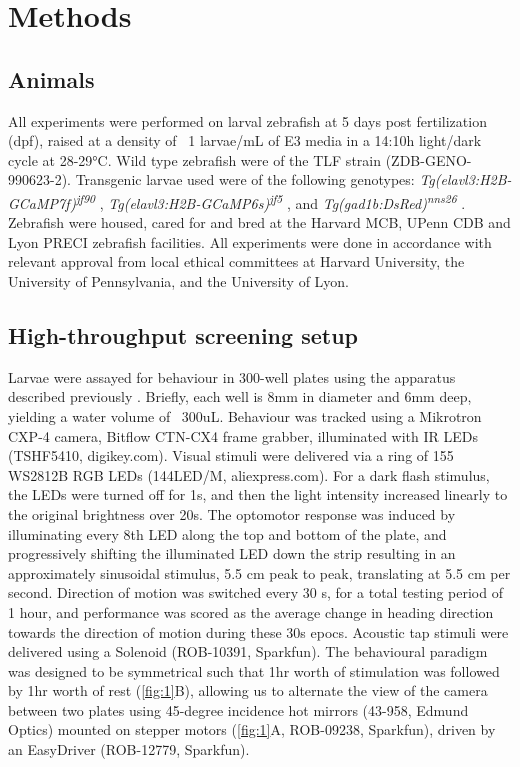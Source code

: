 \documentclass[9pt,lineno]{RandlettLab_elife}
\begin{document}
\section{Methods}

\subsection{Animals}

All experiments were performed on larval zebrafish at 5 days post fertilization (dpf), raised at a density of ~1 larvae/mL of E3 media in a 14:10h light/dark cycle at 28-29°C. Wild type zebrafish were of the TLF strain (ZDB-GENO-990623-2). Transgenic larvae used were of the following genotypes: \emph{Tg(elavl3:H2B-GCaMP7f)\textsuperscript{jf90}} \cite{Yang2021-uf}, \emph{Tg(elavl3:H2B-GCaMP6s)\textsuperscript{jf5}} \cite{Freeman2014-yo}, and \emph{Tg(gad1b:DsRed)\textsuperscript{nns26}} \cite{Satou2013-af}. Zebrafish were housed, cared for and bred at the Harvard MCB, UPenn CDB and Lyon PRECI zebrafish facilities. All experiments were done in accordance with relevant approval from local ethical committees at Harvard University, the University of Pennsylvania, and the University of Lyon. 

\subsection{High-throughput screening setup}

Larvae were assayed for behaviour in 300-well plates using the apparatus described previously \cite{Randlett2019-fi}. Briefly, each well is 8mm in diameter and 6mm deep, yielding a water volume of ~300uL. Behaviour was tracked using a Mikrotron CXP-4 camera, Bitflow CTN-CX4 frame grabber, illuminated with IR LEDs (TSHF5410, digikey.com).  Visual stimuli were delivered via a ring of 155 WS2812B RGB LEDs (144LED/M, aliexpress.com). For a dark flash stimulus, the LEDs were turned off for 1s, and then the light intensity increased linearly to the original brightness over 20s. The optomotor response was induced by illuminating every 8th LED along the top and bottom of the plate, and progressively shifting the illuminated LED down the strip resulting in an approximately sinusoidal stimulus, 5.5 cm peak to peak, translating at 5.5 cm per second. Direction of motion was switched every 30 s, for a total testing period of 1 hour, and performance was scored as the average change in heading direction towards the direction of motion during these 30s epocs. Acoustic tap stimuli were delivered using a Solenoid (ROB-10391, Sparkfun). The behavioural paradigm was designed to be symmetrical such that 1hr worth of stimulation was followed by 1hr worth of rest (\autoref{fig:1}B), allowing us to alternate the view of the camera between two plates using 45-degree incidence hot mirrors (43-958, Edmund Optics) mounted on stepper motors (\autoref{fig:1}A, ROB-09238, Sparkfun), driven by an EasyDriver (ROB-12779, Sparkfun). 
\end{document}
